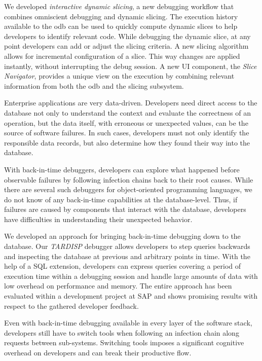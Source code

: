 We developed \emph{interactive dynamic slicing}, a new debugging workflow that combines omniscient debugging and dynamic slicing. 
The execution history available to the \ac{odb} can be used to quickly compute dynamic slices to help developers to identify relevant code.
While debugging the dynamic slice, at any point developers can add or adjust the slicing criteria.
A new slicing algorithm allows for incremental configuration of a slice. 
This way changes are applied instantly, without interrupting the debug session. 
A new UI component, the \emph{Slice Navigator}, provides a unique view on the execution by combining relevant information from both the \ac{odb} and the slicing subsystem.



Enterprise applications are very data-driven.
Developers need direct access to the database not only to understand the context and evaluate the correctness of an operation, but the data itself, with erroneous or unexpected values, can be the source of software failures.
In such cases, developers must not only identify the responsible data records, but also determine how they found their way into the database.

With back-in-time debuggers, developers can explore what happened before observable failures by following infection chains back to their root causes. 
While there are several such debuggers for object-oriented programming languages, we do not know of any back-in-time capabilities at the database-level.
Thus, if failures are caused by components that interact with the database, developers have difficulties in understanding their unexpected behavior.

We developed an approach for bringing back-in-time debugging down to the database.
Our \emph{TARDISP} debugger allows developers to step queries backwards and inspecting the database at previous and arbitrary points in time. 
With the help of a SQL extension, developers can express queries covering a period of execution time within a debugging session and handle large amounts of data with low overhead on performance and memory. 
The entire approach has been evaluated within a development project at SAP and shows promising results with respect to the gathered developer feedback.


Even with back-in-time debugging available in every layer of the software stack, developers still have to switch tools when following an infection chain along requests between sub-systems.
Switching tools imposes a significant cognitive overhead on developers and can break their productive flow.

